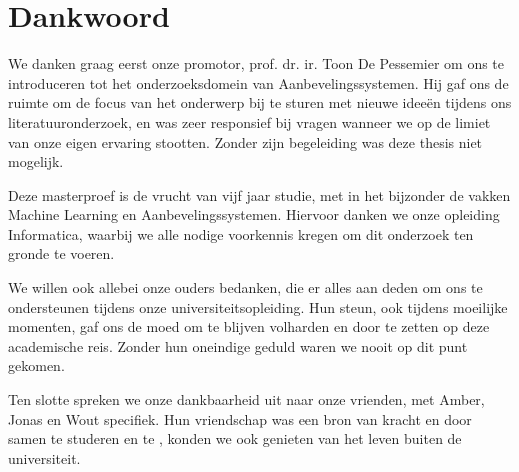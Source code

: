 \chapter{Dankwoord}

We danken graag eerst onze promotor, prof. dr. ir. Toon De Pessemier om ons te introduceren tot het onderzoeksdomein van Aanbevelingssystemen. Hij gaf ons de ruimte om de focus van het onderwerp bij te sturen met nieuwe ideeën tijdens ons literatuuronderzoek, en was zeer responsief bij vragen wanneer we op de limiet van onze eigen ervaring stootten. Zonder zijn begeleiding was deze thesis niet mogelijk.

Deze masterproef is de vrucht van vijf jaar studie, met in het bijzonder de vakken Machine Learning en Aanbevelingssystemen. Hiervoor danken we onze opleiding Informatica, waarbij we alle nodige voorkennis kregen om dit onderzoek ten gronde te voeren.

We willen ook allebei onze ouders bedanken, die er alles aan deden om ons te ondersteunen tijdens onze universiteitsopleiding. Hun steun, ook tijdens moeilijke momenten, gaf ons de moed om te blijven volharden en door te zetten op deze academische reis. Zonder hun oneindige geduld waren we nooit op dit punt gekomen.

Ten slotte spreken we onze dankbaarheid uit naar onze vrienden, met Amber, Jonas en Wout specifiek. Hun vriendschap was een bron van kracht en door samen te studeren en te , konden we ook genieten van het leven buiten de universiteit.